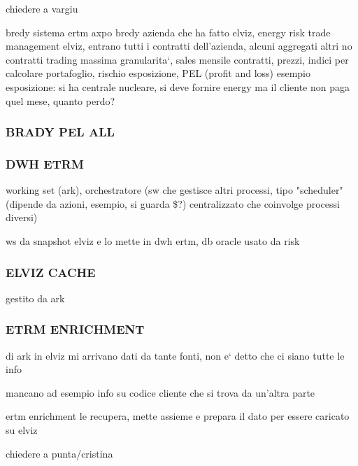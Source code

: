 chiedere a vargiu

bredy sistema ertm axpo
    bredy azienda che ha fatto elviz, energy risk trade management
    elviz, entrano tutti i contratti dell'azienda, alcuni aggregati altri no
        contratti trading massima granularita`, sales mensile
        contratti, prezzi, indici
        per calcolare portafoglio, rischio esposizione, PEL (profit and loss)
        esempio esposizione: si ha centrale nucleare, si deve fornire energy ma il cliente non paga quel mese, quanto  perdo?
        
        
\subsubsection{BRADY PEL ALL}
    
\subsubsection{DWH ETRM}
    
    working set (ark), orchestratore (sw che gestisce altri processi, tipo "scheduler" (dipende da azioni, esempio, si guarda \$?) centralizzato che coinvolge processi diversi)
    
    ws da snapshot elviz e lo mette in dwh ertm, db oracle usato da risk
    
\subsubsection{ELVIZ CACHE}
    
    gestito da ark
\subsubsection{ETRM ENRICHMENT}

    di ark
    in elviz mi arrivano dati da tante fonti, non e` detto che ci siano tutte le info
    
    mancano ad esempio info su codice cliente che si trova da un'altra parte
    
    ertm enrichment le recupera, mette assieme e prepara il dato per essere caricato su elviz
    
    chiedere a punta/cristina